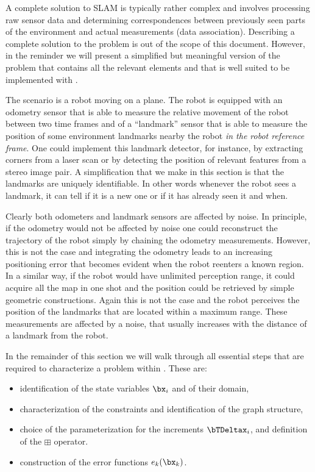 \documentclass[a4paper]{article}
\begin{document}
A complete solution to SLAM is typically rather complex and involves
processing raw sensor data and determining correspondences between
previously seen parts of the environment and actual measurements (data
association). Describing a complete solution to the problem is out of
the scope of this document.  However, in the reminder we will present a
simplified but meaningful version of the problem that contains all the relevant elements
and that is well suited to be implemented with \gopt.

The scenario is a robot moving on a plane. The robot is equipped
with an odometry sensor that is able to measure the relative movement
of the robot between two time frames and of a ``landmark'' sensor
that is able to measure the position of some environment landmarks
nearby the robot \emph{in the robot reference frame}. One could
implement this landmark detector, for instance, by extracting corners
from a laser scan or by detecting the position of relevant features
from a stereo image pair. A simplification that we make in this
section is that the landmarks are uniquely identifiable. In other
words whenever the robot sees a landmark, it can tell if it is a new
one or if it has already seen it and when.

Clearly both odometers and landmark sensors are affected by noise.  In
principle, if the odometry would not be affected by noise one could
reconstruct the trajectory of the robot simply by chaining the
odometry measurements. However, this is not the case and integrating
the odometry leads to an increasing positioning error that becomes
evident when the robot reenters a known region. In a similar way,
if the robot would have unlimited perception range, it could acquire
all the map in one shot and the position could be retrieved by simple
geometric constructions. Again this is not the case and the robot
perceives the position of the landmarks that are located within a
maximum range. These measurements are affected by a noise, that
usually increases with the distance of a landmark from the robot.

In the remainder of this section we will walk through all essential
steps that are required to characterize a problem within \gopt{}.
These are:
\begin{itemize}
\item identification of the state variables $\bx_i$ and of their domain,
\item characterization of the constraints and identification of the graph structure,
\item choice of the parameterization for the increments $\bTDeltax_i$, and definition of the
$\boxplus$ operator.
\item construction of the error functions $e_k(\bx_k)$.
\end{itemize}
\end{document}
